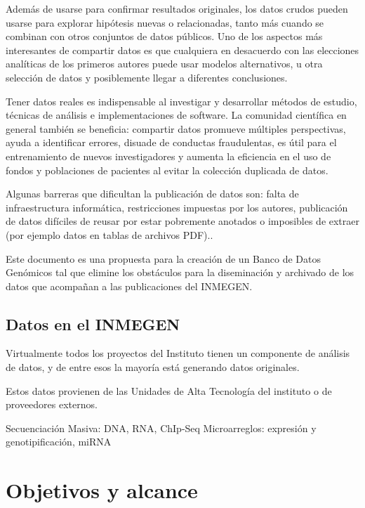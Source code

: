 \documentclass[
10pt, %
letterpaper, %
oneside, %
headinclude,footinclude, %
BCOR5mm, %
]{scrartcl}
\begin{document}
Además de usarse para confirmar resultados originales, los datos
crudos pueden usarse para explorar hipótesis nuevas o relacionadas,
tanto más cuando se combinan con otros conjuntos de datos públicos.
Uno de los aspectos más interesantes de compartir datos es que
cualquiera en desacuerdo con las elecciones analíticas de los primeros
autores puede usar modelos alternativos, u otra selección de datos y
posiblemente llegar a diferentes conclusiones.

Tener datos reales es indispensable al investigar y desarrollar
métodos de estudio, técnicas de análisis e implementaciones de
software. La comunidad científica en general también se beneficia:
compartir datos promueve múltiples perspectivas, ayuda a identificar
errores, disuade de conductas fraudulentas, es útil para el
entrenamiento de nuevos investigadores y aumenta la eficiencia en el
uso de fondos y poblaciones de pacientes al evitar la colección
duplicada de datos.\cite{piwowar_sharing_2007}

Algunas barreras que dificultan la publicación de datos son: falta de
infraestructura informática, restricciones impuestas por los autores,
publicación de datos difíciles de reusar por estar pobremente anotados
o imposibles de extraer (por ejemplo datos en tablas de archivos
PDF).\cite{molloy_open_2011}.

Este documento es una propuesta para la creación de un Banco de Datos
Genómicos tal que elimine los obstáculos para la diseminación y
archivado de los datos que acompañan a las publicaciones del INMEGEN.


\subsection{Datos en el INMEGEN}

Virtualmente todos los proyectos del Instituto tienen un componente de
análisis de datos, y de entre esos la mayoría está generando datos
originales.

Estos datos provienen de las Unidades de Alta Tecnología del instituto
o de proveedores externos.

Secuenciación Masiva: DNA, RNA, ChIp-Seq
Microarreglos: expresión y genotipificación, miRNA



\section{Objetivos y alcance}
\end{document}
